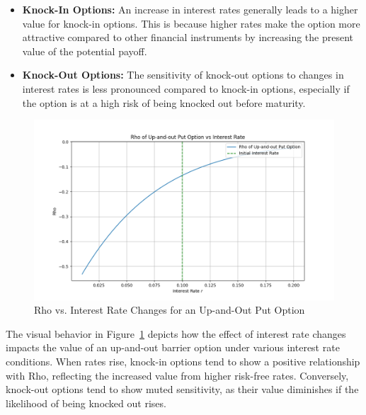 \begin{itemize}
    \item \textbf{Knock-In Options:} An increase in interest rates generally leads to a higher value for knock-in options. This is because higher rates make the option more attractive compared to other financial instruments by increasing the present value of the potential payoff.
    \item \textbf{Knock-Out Options:} The sensitivity of knock-out options to changes in interest rates is less pronounced compared to knock-in options, especially if the option is at a high risk of being knocked out before maturity.
\end{itemize}
\begin{figure}[h]
    \centering
    \includegraphics[width=.65\linewidth]{content/images/rho_upout.png}
    \caption{Rho vs. Interest Rate Changes for an Up-and-Out Put Option}
    \label{fig:rho_behavior}
\end{figure}

The visual behavior in Figure~\ref{fig:rho_behavior} depicts how the effect of interest rate changes impacts the value of an up-and-out barrier option under various interest rate conditions. When rates rise, knock-in options tend to show a positive relationship with Rho, reflecting the increased value from higher risk-free rates. Conversely, knock-out options tend to show muted sensitivity, as their value diminishes if the likelihood of being knocked out rises.
